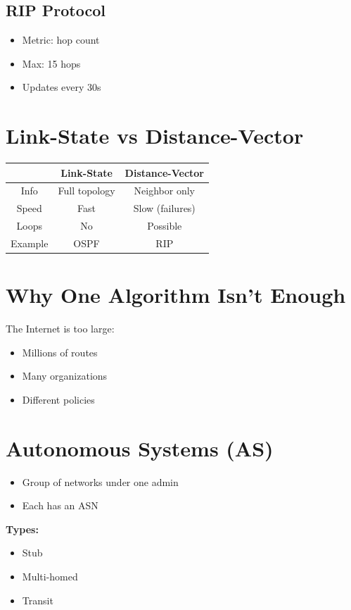 \documentclass[11pt]{article}
\begin{document}
\subsection{RIP Protocol}
\begin{itemize}
    \item Metric: hop count
    \item Max: 15 hops
    \item Updates every 30s
\end{itemize}

\section{Link-State vs Distance-Vector}
\begin{tabular}{|c|c|c|}
\hline
 & Link-State & Distance-Vector \\
\hline
Info & Full topology & Neighbor only \\
\hline
Speed & Fast & Slow (failures) \\
\hline
Loops & No & Possible \\
\hline
Example & OSPF & RIP \\
\hline
\end{tabular}

\section{Why One Algorithm Isn't Enough}
The Internet is too large:
\begin{itemize}
    \item Millions of routes
    \item Many organizations
    \item Different policies
\end{itemize}

\section{Autonomous Systems (AS)}
\begin{itemize}
    \item Group of networks under one admin
    \item Each has an ASN
\end{itemize}

\textbf{Types:}
\begin{itemize}
    \item Stub
    \item Multi-homed
    \item Transit
\end{itemize}
\end{document}
